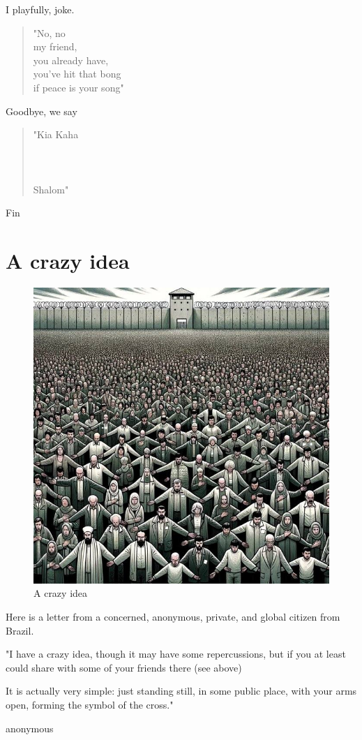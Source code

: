 \documentclass[16pt,openany,oneside]{book}
\begin{document}
I playfully, joke.
\begin{quote}
    "No, no\\
    my friend,\\
    you already have,\\
    you've hit that bong\\
     if peace is your song"
\end{quote}
Goodbye, we say\\
\begin{quote}
           "Kia Kaha\\
           \\
            \\\\ 
           Shalom"
\end{quote}

Fin

\chapter{A crazy idea}

\begin{figure}[H]
    \centering
    \includegraphics[width=0.7\linewidth]{assets/crazy_idea.jpg}
    \caption{A crazy idea}
    \label{fig:crazy-idea}
\end{figure}

Here is a letter from a concerned, anonymous, private, and global citizen from Brazil.

\epigraph{
    "I have a crazy idea, though it may have some
    repercussions, but if you at least could share with
    some of your friends there (see above)
    
    It is actually very simple: just standing still, in some
    public place, with your arms open, forming the
    symbol of the cross."
}{anonymous}
\end{document}
